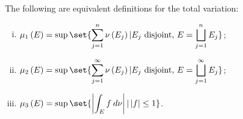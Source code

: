 \documentclass[10pt]{mypackage}
\begin{document}
\begin{proposition}
  The following are equivalent definitions for the total variation:
  \begin{enumerate}[(i)]
    \item $\displaystyle \mu_1\left( E \right) = \sup\set{\sum_{j=1}^{n}\nu\left( E_j \right) | E_j\text{ disjoint, }E = \bigsqcup_{j=1}^{n}E_j}$;
    \item $\displaystyle \mu_2\left( E \right) = \sup\set{\sum_{j=1}^{\infty}\nu\left( E_j \right) | E_j\text{ disjoint, }E = \bigsqcup_{j=1}^{\infty}E_j}$;
    \item $\displaystyle \mu_3\left( E \right) = \sup\set{\left\vert \int_{E}^{} f\:d\nu \right\vert | \left\vert f \right\vert\leq 1}$.
  \end{enumerate}
\end{proposition}
\end{document}
